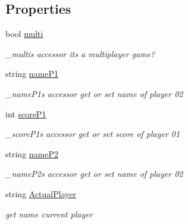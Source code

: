 \subsection*{Properties}
\begin{DoxyCompactItemize}
\item 
bool \hyperlink{class_morpion_1_1_model_a2374180fb8d3bedd6aed97fb58fab4d1}{multi}
\begin{DoxyCompactList}\small\item\em \+\_\+multi\textquotesingle{}s accessor it\textquotesingle{}s a multiplayer game? \end{DoxyCompactList}\item 
string \hyperlink{class_morpion_1_1_model_a669ba19f89288e27a3d6d14a09c5d120}{name\+P1}
\begin{DoxyCompactList}\small\item\em \+\_\+name\+P1\textquotesingle{}s accessor get or set name of player 02 \end{DoxyCompactList}\item 
int \hyperlink{class_morpion_1_1_model_a3a3d4b691a3a8c7731a07c83aeba3dd1}{score\+P1}
\begin{DoxyCompactList}\small\item\em \+\_\+score\+P1\textquotesingle{}s accessor get or set score of player 01 \end{DoxyCompactList}\item 
string \hyperlink{class_morpion_1_1_model_a8bf5f2b2a26a3220076fdf45fb81a871}{name\+P2}
\begin{DoxyCompactList}\small\item\em \+\_\+name\+P2\textquotesingle{}s accessor get or set name of player 02 \end{DoxyCompactList}\item 
string \hyperlink{class_morpion_1_1_model_adc7a7e85bab1d3a90418792a1e8078cf}{Actual\+Player}
\begin{DoxyCompactList}\small\item\em get name current player \end{DoxyCompactList}\item 

\end{DoxyCompactItemize}
